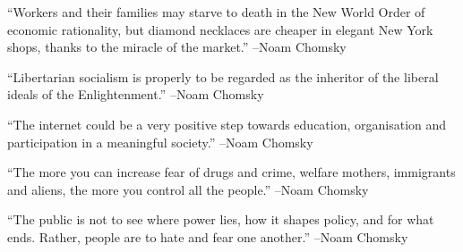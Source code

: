 \documentclass{article}%
\begin{document}
\linebreak%
\vspace{1mm}%
\begin{minipage}{\textwidth}%
\flushleft%
“Workers and their families may starve to death in the New World Order of economic rationality, but diamond necklaces are cheaper in elegant New York shops, thanks to the miracle of the market.”%
\linebreak%
\vspace{1mm}%
–Noam Chomsky%
\linebreak%
\vspace{1mm}%
\end{minipage}%
\linebreak%
\vspace{1mm}%
\begin{minipage}{\textwidth}%
\flushleft%
“Libertarian socialism is properly to be regarded as the inheritor of the liberal ideals of the Enlightenment.”%
\linebreak%
\vspace{1mm}%
–Noam Chomsky%
\linebreak%
\vspace{1mm}%
\end{minipage}%
\linebreak%
\vspace{1mm}%
\begin{minipage}{\textwidth}%
\flushleft%
“The internet could be a very positive step towards education, organisation and participation in a meaningful society.”%
\linebreak%
\vspace{1mm}%
–Noam Chomsky%
\linebreak%
\vspace{1mm}%
\end{minipage}%
\linebreak%
\vspace{1mm}%
\begin{minipage}{\textwidth}%
\flushleft%
“The more you can increase fear of drugs and crime, welfare mothers, immigrants and aliens, the more you control all the people.”%
\linebreak%
\vspace{1mm}%
–Noam Chomsky%
\linebreak%
\vspace{1mm}%
\end{minipage}%
\linebreak%
\vspace{1mm}%
\begin{minipage}{\textwidth}%
\flushleft%
“The public is not to see where power lies, how it shapes policy, and for what ends. Rather, people are to hate and fear one another.”%
\linebreak%
\vspace{1mm}%
–Noam Chomsky%
\linebreak%
\vspace{1mm}%
\end{minipage}%
\end{document}
